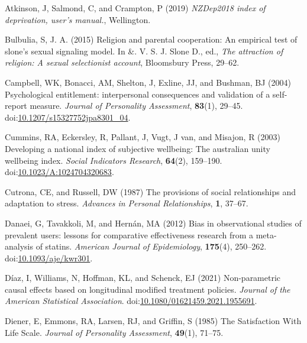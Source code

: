 \documentclass[
  singlecolumn,
  9pt]{article}
\newlength{\cslhangindent}
\newenvironment{CSLReferences}[2] %
 {\begin{list}{}{%
  \setlength{\itemindent}{0pt}
  \setlength{\leftmargin}{0pt}
  \setlength{\parsep}{0pt}
  \ifodd #1
   \setlength{\leftmargin}{\cslhangindent}
   \setlength{\itemindent}{-1\cslhangindent}
  \fi
  \setlength{\itemsep}{#2\baselineskip}}}
 {\end{list}}
\begin{document}
\label{refs}
\begin{CSLReferences}{1}{0}
Atkinson, J, Salmond, C, and Crampton, P (2019) \emph{NZDep2018 index of
deprivation, user{'}s manual.}, Wellington.

Bulbulia, S, J. A. (2015) Religion and parental cooperation: An
empirical test of slone's sexual signaling model. In \&. V. S. J. Slone
D., ed., \emph{The attraction of religion: A sexual selectionist
account}, Bloomsbury Press, 29--62.

Campbell, WK, Bonacci, AM, Shelton, J, Exline, JJ, and Bushman, BJ
(2004) Psychological entitlement: interpersonal consequences and
validation of a self-report measure. \emph{Journal of Personality
Assessment}, \textbf{83}(1), 29--45.
doi:\href{https://doi.org/10.1207/s15327752jpa8301_04}{10.1207/s15327752jpa8301\_04}.

Cummins, RA, Eckersley, R, Pallant, J, Vugt, J van, and Misajon, R
(2003) Developing a national index of subjective wellbeing: The
australian unity wellbeing index. \emph{Social Indicators Research},
\textbf{64}(2), 159--190.
doi:\href{https://doi.org/10.1023/A:1024704320683}{10.1023/A:1024704320683}.

Cutrona, CE, and Russell, DW (1987) The provisions of social
relationships and adaptation to stress. \emph{Advances in Personal
Relationships}, \textbf{1}, 37--67.

Danaei, G, Tavakkoli, M, and Hernán, MA (2012) Bias in observational
studies of prevalent users: lessons for comparative effectiveness
research from a meta-analysis of statins. \emph{American Journal of
Epidemiology}, \textbf{175}(4), 250--262.
doi:\href{https://doi.org/10.1093/aje/kwr301}{10.1093/aje/kwr301}.

Díaz, I, Williams, N, Hoffman, KL, and Schenck, EJ (2021) Non-parametric
causal effects based on longitudinal modified treatment policies.
\emph{Journal of the American Statistical Association}.
doi:\href{https://doi.org/10.1080/01621459.2021.1955691}{10.1080/01621459.2021.1955691}.

Diener, E, Emmons, RA, Larsen, RJ, and Griffin, S (1985) The
Satisfaction With Life Scale. \emph{Journal of Personality Assessment},
\textbf{49}(1), 71--75.


\end{CSLReferences}
\end{document}
